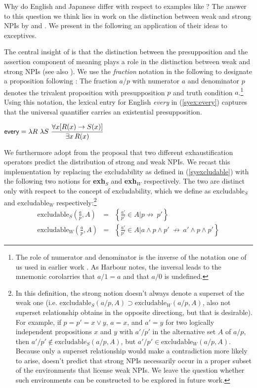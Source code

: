\documentclass[output=paper]{langscibook}
\def\existsx{\ifmmode\mathop{\exists x}\else$\exists x$\xspace\fi}
\def\forallx{\ifmmode\mathop{\forall x}\else$\forall x$\xspace\fi}
\begin{document}
Why do English and Japanese differ with respect to examples like ?
The answer to this question we think lies in work on the distinction between weak and strong NPIs by \citet{gajewski11a} and \citet{chierchia13a}.
We present in the following an application of their ideas to exceptives.  

The central insight of \citet{gajewski11a} is that the distinction between the presupposition and the assertion component of meaning plays a role in the distinction between weak and strong NPIs (see also \citealt{homer08h}).
We use the \emph{fraction} notation in the following to designate a proposition  following \citet{harbour14a}: The fraction $a/p$ with numerator $a$ and denominator $p$ denotes the trivalent proposition with presupposition $p$ and truth condition $a$.\footnote{The role of numerator and denominator is the inverse of the notation one of us used in earlier work \citep{sauerland05f}. As Harbour notes, the inversal leads to the mnemonic corolarries that $a/1 = a$ and that $a/0$ is undefined.} Using this notation, the lexical entry for English \emph{every} in (\ref{syex:every}) captures that the universal quantifier carries an existential presupposition.

\ea \label{syex:every}
$\displaystyle \textsf{every} = \lambda R\ \lambda S\ \frac{\forallx [R(x) \rightarrow S(x)]}{\existsx R(x)}$\z

We furthermore adopt from \citet{chierchia13a} the proposal that two different exhaustification operators predict the distribution of strong and weak NPIs.
We recast this implementation by replacing the excludability as defined in (\ref{syexcludable}) with the following two notions for \textbf{exh}$_{S}$ and \textbf{exh}$_W$ respectively.
The two are distinct only with respect to the concept of excludability, which we define as excludable$_S$ and excludable$_W$ respectively:\footnote{In this definition, the strong notion doesn't always denote a superset of the weak one (i.e. $\text{excludable}_S(a/p,A) \supset \text{excludable}_W(a/p,A)$, also not superset relationship obtains in the opposite directiong, but that is desirable). For example, if $p = p' = x \lor y$, $a = x$, and $a' = y$ for two logically independent propositions $x$ and $y$ with $a'/p'$ in the alternative set $A$ of $a/p$,  then
$a'/p' \not\in \text{excludable}_S(a/p,A)$, but  $a'/p' \in \text{excludable}_W(a/p,A)$. Because only a superset relationship would make a contradiction more likely to arise, \citet{chierchia13a} doesn't predict that strong NPIs necessarily occur in a proper subset of the environments that license weak NPIs. 
We leave the question whether such environments can be constructed to be explored in future work.}
\begin{eqnarray*}
\text{excludable}_S\left(\frac{a}{p},A\right) &=& \left\{\frac{a'}{p'} \in A \mathrel{\Big|}  p  \not\rightarrow\ p'\right\}\\[1ex]
\text{excludable}_W\left(\frac{a}{p},A\right) &=& \left\{\frac{a'}{p'} \in A \mathrel{\Big|}  a \land p \land p' \  \not\rightarrow\ a' \land p \land p'\right\}
\end{eqnarray*}
\end{document}
